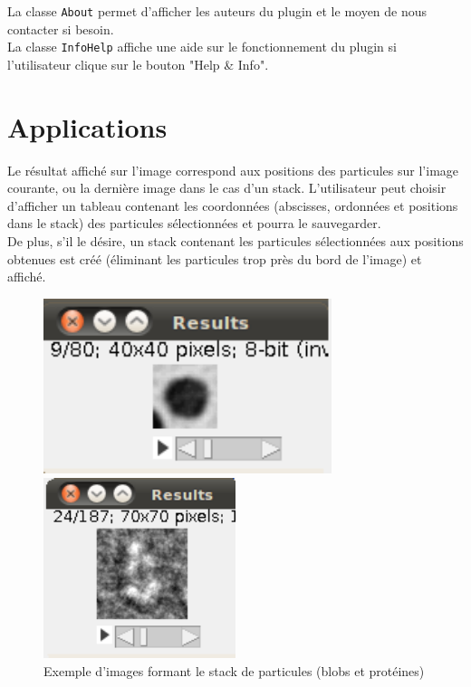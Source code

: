 La classe \texttt{About} permet d'afficher les auteurs du plugin et le moyen de nous contacter si besoin. \\

La classe \texttt{InfoHelp} affiche une aide sur le fonctionnement du plugin si l'utilisateur  clique sur le bouton "Help \& Info". 

\section{Applications}

Le résultat affiché sur l'image correspond aux positions des particules sur l'image courante, ou la dernière image dans le cas d'un stack.
L'utilisateur peut choisir d'afficher un tableau contenant les coordonnées (abscisses, ordonnées et positions dans le stack) des particules sélectionnées et pourra le sauvegarder. \\

De plus, s'il le désire, un stack contenant les particules sélectionnées aux positions obtenues est créé (éliminant les particules trop près du bord de l'image) et affiché.

\begin{figure}[!ht]
\begin{center}
 \begin{minipage}{.450\linewidth}
  \includegraphics[width=0.75\textwidth]{cropblob.png}  
 \end{minipage} \hfill
\begin{minipage}{.450\linewidth}
  \includegraphics[width=0.5\textwidth]{cropprotDog.png}   
 \end{minipage} \hfill
\caption{Exemple d'images formant le stack de particules (blobs et protéines)}
\end{center}
\end{figure}

